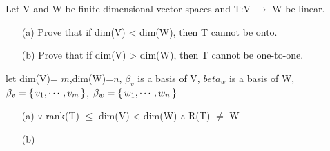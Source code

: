 Let V and W be finite-dimensional vector spaces and T:V $\rightarrow$ W be linear.

\begin{enumerate}
	\item[(a)] Prove that if dim(V) < dim(W), then T cannot be onto.
	\item[(b)] Prove that if dim(V) > dim(W), then T cannot be one-to-one.
\end{enumerate}

\begin{tcolorbox}
\begin{solution}
let dim(V)= $m$,dim(W)=$n$, $\beta_v$ is a basis of V, $beta_w$ is a basis of W, $\beta_v = \left\{ \,v_1,\cdots,v_m \,\right\}$, $\beta_w = \left\{ \,w_1,\cdots,w_n \,\right\}$

\begin{enumerate}
	\item[(a)] $\because$ rank(T) $\leq$ dim(V) < dim(W) $\therefore$ R(T) $\neq$ W
	\item[(b)]
\end{enumerate}

\end{solution}

\end{tcolorbox}